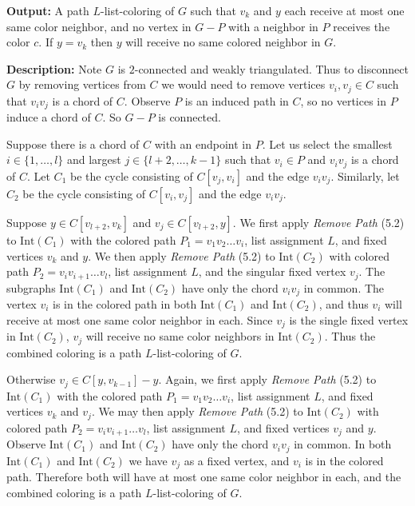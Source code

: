 \documentclass[letterpaper, 12pt]{article}
\theoremstyle{definition}
\theoremstyle{definition}
\theoremstyle{thm}
\theoremstyle{definition}
\begin{document}
\noindent\textbf{Output:} A path $L$-list-coloring of $G$ such that $v_k$ and
$y$ each receive at most one same color neighbor, and no vertex in
$G-P$ with a neighbor in $P$ receives the color $c$. If $y=v_k$ then $y$ will
receive no same colored neighbor in $G$.

\noindent\textbf{Description:}
Note $G$ is $2$-connected and weakly triangulated. Thus to disconnect $G$ by
removing vertices from $C$ we would need to remove vertices
$v_i,v_j\in C$ such that $v_iv_j$ is a chord of $C$.
Observe $P$ is an induced path in $C$, so no vertices in $P$ induce a chord of
$C$. So $G-P$ is connected.

Suppose there is a chord of $C$ with an endpoint in $P$. Let us select the
smallest $i\in\{1,\ldots,l\}$ and largest
$j\in\{l+2,\ldots,k-1\}$ such that $v_i\in P$ and $v_iv_j$ is a chord of $C$. Let $C_1$ be the
cycle consisting of $C[v_j,v_i]$ and the edge $v_iv_j$. Similarly, let $C_2$ be
the cycle consisting of $C[v_i,v_j]$ and the edge $v_iv_j$.

Suppose $y\in C[v_{l+2},v_{k}]$ and $v_j\in C[v_{l+2},y]$. 
We first apply \textit{Remove Path} (5.2) to $\text{Int}(C_1)$ with the colored
path $P_1=v_1v_2\ldots v_i$, list assignment $L$, and fixed vertices $v_k$ and $y$.
We then apply \textit{Remove Path} (5.2)
to $\text{Int}(C_2)$ with colored path $P_2=v_iv_{i+1}\ldots v_l$, list
assignment $L$, and the singular fixed vertex $v_j$. The subgraphs
$\text{Int}(C_1)$ and $\text{Int}(C_2)$ have only the chord $v_iv_j$ in common.
The vertex $v_i$ is in the colored path in both $\text{Int}(C_1)$ and $\text{Int}(C_2)$,
and thus $v_i$ will receive at most one same color neighbor in each.
Since $v_j$ is the single fixed vertex in $\text{Int}(C_2)$, $v_j$ will receive
no same color neighbors in $\text{Int}(C_2)$. Thus the combined coloring is a
path $L$-list-coloring of $G$.

Otherwise $v_j\in C[y,v_{k-1}]-y$. Again, we first apply \textit{Remove Path} (5.2) to
$\text{Int}(C_1)$ with the colored path $P_1=v_1v_2\ldots v_i$, list assignment
$L$, and fixed vertices $v_k$ and $v_j$. We may then apply \textit{Remove Path}
(5.2) to $\text{Int}(C_2)$ with colored
path $P_2=v_iv_{i+1}\ldots v_l$, list assignment $L$, and fixed vertices $v_j$
and $y$. Observe $\text{Int}(C_1)$ and $\text{Int}(C_2)$ have only the chord
$v_iv_j$ in common. In both $\text{Int}(C_1)$ and $\text{Int}(C_2)$ we have
$v_j$ as a fixed vertex, and $v_i$ is in the colored path. Therefore both
will have at most one same color neighbor in each, and the combined coloring
is a path $L$-list-coloring of $G$.
\end{document}

